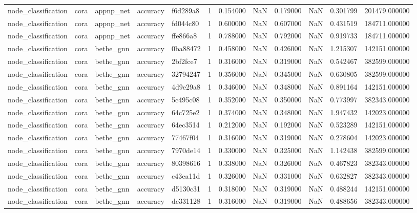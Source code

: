 \begin{tabular}{lllllrrrrrrr}
node_classification & cora & appnp_net & accuracy & f6d289a8 & 1 & 0.154000 & NaN & 0.179000 & NaN & 0.301799 & 201479.000000 \\
node_classification & cora & appnp_net & accuracy & fd044c80 & 1 & 0.600000 & NaN & 0.607000 & NaN & 0.431519 & 184711.000000 \\
node_classification & cora & appnp_net & accuracy & ffe866a8 & 1 & 0.788000 & NaN & 0.792000 & NaN & 0.919733 & 184711.000000 \\
node_classification & cora & bethe_gnn & accuracy & 0ba88472 & 1 & 0.458000 & NaN & 0.426000 & NaN & 1.215307 & 142151.000000 \\
node_classification & cora & bethe_gnn & accuracy & 2bf2fce7 & 1 & 0.316000 & NaN & 0.319000 & NaN & 0.542467 & 382599.000000 \\
node_classification & cora & bethe_gnn & accuracy & 32794247 & 1 & 0.356000 & NaN & 0.345000 & NaN & 0.630805 & 382599.000000 \\
node_classification & cora & bethe_gnn & accuracy & 4d9e29a8 & 1 & 0.346000 & NaN & 0.348000 & NaN & 0.891164 & 142151.000000 \\
node_classification & cora & bethe_gnn & accuracy & 5c495c08 & 1 & 0.352000 & NaN & 0.350000 & NaN & 0.773997 & 382343.000000 \\
node_classification & cora & bethe_gnn & accuracy & 64c725e2 & 1 & 0.374000 & NaN & 0.348000 & NaN & 1.947432 & 142023.000000 \\
node_classification & cora & bethe_gnn & accuracy & 64ec3514 & 1 & 0.212000 & NaN & 0.192000 & NaN & 0.523289 & 142151.000000 \\
node_classification & cora & bethe_gnn & accuracy & 77467f04 & 1 & 0.316000 & NaN & 0.319000 & NaN & 0.278604 & 142023.000000 \\
node_classification & cora & bethe_gnn & accuracy & 7970de14 & 1 & 0.330000 & NaN & 0.325000 & NaN & 1.142438 & 382599.000000 \\
node_classification & cora & bethe_gnn & accuracy & 80398616 & 1 & 0.338000 & NaN & 0.326000 & NaN & 0.467823 & 382343.000000 \\
node_classification & cora & bethe_gnn & accuracy & c43ea11d & 1 & 0.326000 & NaN & 0.331000 & NaN & 0.632827 & 382343.000000 \\
node_classification & cora & bethe_gnn & accuracy & d5130c31 & 1 & 0.318000 & NaN & 0.319000 & NaN & 0.488244 & 142151.000000 \\
node_classification & cora & bethe_gnn & accuracy & dc331128 & 1 & 0.316000 & NaN & 0.319000 & NaN & 0.488656 & 382343.000000 \\

\end{tabular}
